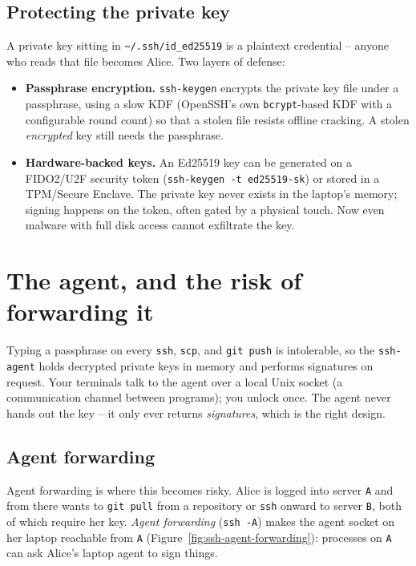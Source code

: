 \subsection{Protecting the private key}

A private key sitting in \texttt{\textasciitilde/.ssh/id\_ed25519} is a plaintext credential -- anyone who reads that file becomes Alice. Two layers of defense:

\begin{itemize}
  \item \textbf{Passphrase encryption.} \texttt{ssh-keygen} encrypts the private key file under a passphrase, using a slow KDF (OpenSSH's own \texttt{bcrypt}-based KDF with a configurable round count) so that a stolen file resists offline cracking. A stolen \emph{encrypted} key still needs the passphrase.
  \item \textbf{Hardware-backed keys.} An Ed25519 key can be generated on a FIDO2/U2F security token (\texttt{ssh-keygen -t ed25519-sk}) or stored in a TPM/Secure Enclave. The private key never exists in the laptop's memory; signing happens on the token, often gated by a physical touch. Now even malware with full disk access cannot exfiltrate the key.
\end{itemize}

\section{The agent, and the risk of forwarding it}

Typing a passphrase on every \texttt{ssh}, \texttt{scp}, and \texttt{git push} is intolerable, so the \texttt{ssh-agent} holds decrypted private keys in memory and performs signatures on request. Your terminals talk to the agent over a local Unix socket (a communication channel between programs); you unlock once. The agent never hands out the key -- it only ever returns \emph{signatures}, which is the right design.

\subsection{Agent forwarding}

Agent forwarding is where this becomes risky. Alice is logged into server \texttt{A} and from there wants to \texttt{git pull} from a repository or \texttt{ssh} onward to server \texttt{B}, both of which require her key. \emph{Agent forwarding} (\texttt{ssh -A}) makes the agent socket on her laptop reachable from \texttt{A} (Figure~\ref{fig:ssh-agent-forwarding}): processes on \texttt{A} can ask Alice's laptop agent to sign things.

